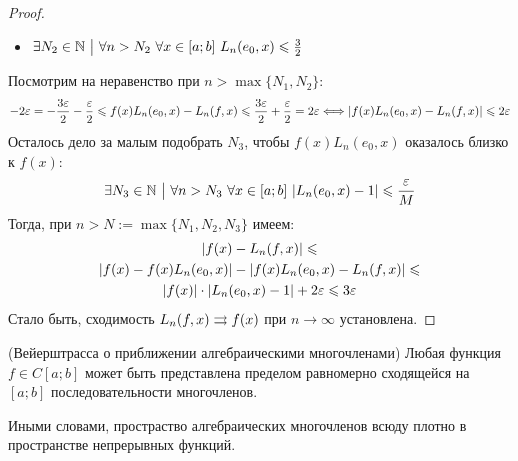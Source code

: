 \begin{proof}
\begin{itemize}
		\item $\exists N_2 \in \mathbb{N} \ \big|\  \forall n > N_2\ \forall x \in [a; b]\ L_n(e_0, x) \leqslant \frac{3}{2}$
	\end{itemize}
	Посмотрим на неравенство при $n > \max\{N_1, N_2\}$:
	\[
		-2\varepsilon = -\frac{3\varepsilon}{2} - \frac{\varepsilon}{2} \leqslant f(x)L_n(e_0, x) - L_n(f, x) \leqslant \frac{3\varepsilon}{2} + \frac{\varepsilon}{2} = 2\varepsilon \Longleftrightarrow |f(x)L_n(e_0, x) - L_n(f, x)| \leqslant 2\varepsilon
	\]
	Осталось дело за малым подобрать $N_3$, чтобы $f(x)L_n(e_0, x)$ оказалось близко к $f(x)$:
	\[
		\exists N_3 \in \mathbb{N} \ \big|\  \forall n > N_3\ \forall x \in [a; b]\ |L_n(e_0, x) - 1| \leqslant \frac{\varepsilon}{M}
	\]
	Тогда, при $n > N := \max\{N_1, N_2, N_3\}$ имеем:
	\begin{multline*}
		|f(x) - L_n(f, x)| \leqslant
		\\
		|f(x) - f(x)L_n(e_0, x)| - |f(x)L_n(e_0, x) - L_n(f, x)| \leqslant
		\\
		|f(x)| \cdot |L_n(e_0, x) - 1| + 2\varepsilon \leqslant 3\varepsilon
	\end{multline*}
	Стало быть, сходимость $L_n(f, x) \rightrightarrows f(x)$ при $n \to \infty$ установлена.
\end{proof}

\begin{theorem} (Вейерштрасса о приближении алгебраическими многочленами)
	Любая функция $f \in C[a; b]$ может быть представлена пределом равномерно сходящейся на $[a; b]$ последовательности многочленов.
\end{theorem}

\begin{note}
	Иными словами, простраство алгебраических многочленов всюду плотно в пространстве непрерывных функций.
\end{note}

